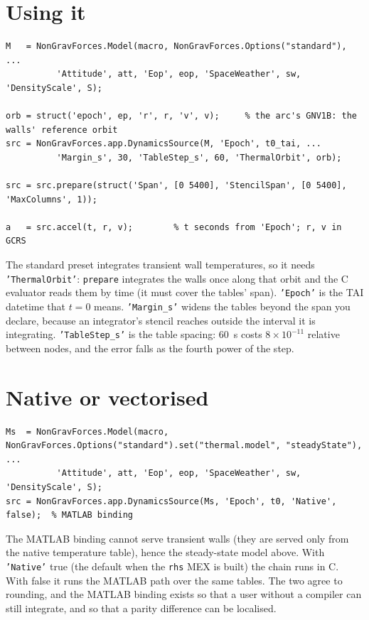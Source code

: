 \documentclass[11pt,a4paper]{report}
\begin{document}
\section{Using it}
\begin{lstlisting}
M   = NonGravForces.Model(macro, NonGravForces.Options("standard"), ...
          'Attitude', att, 'Eop', eop, 'SpaceWeather', sw, 'DensityScale', S);

orb = struct('epoch', ep, 'r', r, 'v', v);     % the arc's GNV1B: the walls' reference orbit
src = NonGravForces.app.DynamicsSource(M, 'Epoch', t0_tai, ...
          'Margin_s', 30, 'TableStep_s', 60, 'ThermalOrbit', orb);

src = src.prepare(struct('Span', [0 5400], 'StencilSpan', [0 5400], 'MaxColumns', 1));

a   = src.accel(t, r, v);        % t seconds from 'Epoch'; r, v in GCRS
\end{lstlisting}

\noindent The standard preset integrates transient wall temperatures, so it needs
\texttt{'ThermalOrbit'}: \texttt{prepare} integrates the walls once along that orbit and the C
evaluator reads them by time (it must cover the tables' span). \texttt{'Epoch'} is the TAI datetime that $t=0$ means. \texttt{'Margin\_s'} widens the
tables beyond the span you declare, because an integrator's stencil reaches outside the interval it
is integrating. \texttt{'TableStep\_s'} is the table spacing: \SI{60}{\second} costs
$8\times10^{-11}$ relative between nodes, and the error falls as the fourth power of the step.

\section{Native or vectorised}
\begin{lstlisting}
Ms  = NonGravForces.Model(macro, NonGravForces.Options("standard").set("thermal.model", "steadyState"), ...
          'Attitude', att, 'Eop', eop, 'SpaceWeather', sw, 'DensityScale', S);
src = NonGravForces.app.DynamicsSource(Ms, 'Epoch', t0, 'Native', false);  % MATLAB binding
\end{lstlisting}

\noindent The MATLAB binding cannot serve transient walls (they are served only from the native
temperature table), hence the steady-state model above. With \texttt{'Native'} true (the default when the \texttt{rhs} MEX is built) the chain runs
in C. With false it runs the MATLAB path over the same tables. The two agree to rounding, and the
MATLAB binding exists so that a user without a compiler can still integrate, and so that a parity
difference can be localised.
\end{document}
